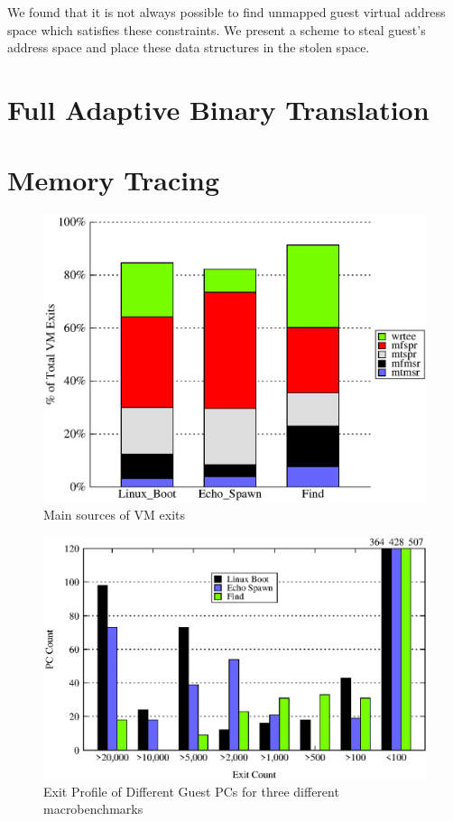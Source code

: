 We found that it is not always possible to find unmapped guest virtual address space which satisfies these constraints. We present a scheme to steal guest’s address space and place these data structures in the stolen space.

\section{Full Adaptive Binary Translation}
\label{full_binary_translation}

\section{Memory Tracing}
\label{memory_tracing}

\begin{figure}[!htb]
\centering
\includegraphics[scale=0.5]{exit_count.eps}
\caption{\label{fig:opcode_exit_fraction}Main sources of VM exits}
\end{figure}

\begin{figure}[!htb]
\centering

\includegraphics[scale=0.5]{pc_count.eps}
\caption{\label{fig:pc_profile}Exit Profile of Different Guest PCs for three different macrobenchmarks}
\end{figure}

